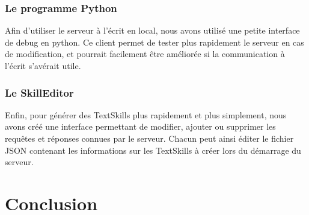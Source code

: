 \documentclass[a4paper,10pt]{report}
\begin{document}
        \subsection{Le programme Python}
          {Afin d'utiliser le serveur à l'écrit en local, nous avons utilisé une petite interface de debug en python. Ce client permet de tester plus rapidement le serveur en cas de modification, et pourrait facilement être améliorée si la communication à l'écrit s'avérait utile.}

        \subsection{Le SkillEditor}
          {Enfin, pour générer des TextSkills plus rapidement et plus simplement, nous avons créé une interface permettant de modifier, ajouter ou supprimer les requêtes et réponses connues par le serveur. Chacun peut ainsi éditer le fichier JSON contenant les informations sur les TextSkills à créer lors du démarrage du serveur.}
    \chapter{Conclusion}
\end{document}

